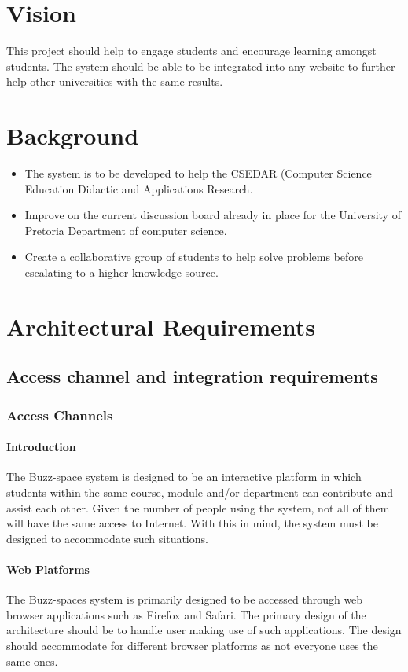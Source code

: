 \documentclass[10pt]{article}
\begin{document}
\section{Vision}
This project should help to engage students and encourage learning amongst students. The system should be able to be integrated into any website to further help other universities with the same results.

\section{Background}
\begin{itemize}
\item The system is to be developed to help the CSEDAR (Computer Science Education Didactic and Applications Research.
\item Improve on the current discussion board already in place for the University of Pretoria Department of computer science.
\item Create a collaborative group of students to help solve problems before escalating to a higher knowledge source.
\end{itemize}


\section{Architectural Requirements}
\subsection{Access channel and integration requirements} 
\subsubsection{Access Channels}
\paragraph{Introduction}
The Buzz-space system is designed to be an interactive platform in which students within the same course, module and/or department can contribute and assist each other. Given the number of people using the system, not all of them will have the same access to Internet. With this in mind, the system must be designed to accommodate such situations.

\paragraph{Web Platforms}
The Buzz-spaces system is primarily designed to be accessed through web browser applications such as Firefox and Safari. The primary design of the architecture should be to handle user making use of such applications. The design should accommodate for different browser platforms as not everyone uses the same ones.
\end{document}
